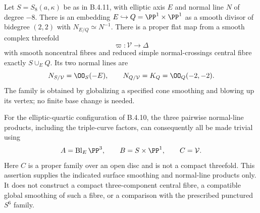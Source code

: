 \begin{proposition}\label{push:src:B.4.12}
Let $S=S_8(a,\kappa)$ be as in B.4.11, with elliptic axis $E$
and normal line $N$ of degree $-8$.
There is an embedding $E\hookrightarrow Q=\PP^1\times\PP^1$
as a smooth divisor of bidegree $(2,2)$ with
$N_{E/Q}\simeq N^{-1}$.
There is a proper flat map from a smooth complex threefold
\[
 \varpi:\mathcal V\longrightarrow\Delta
\]
with smooth noncentral fibres and reduced simple normal-crossings
central fibre exactly $S\cup_E Q$.  Its two normal lines are
\[
 N_{S/\mathcal V}=\OO_S(-E),\qquad
 N_{Q/\mathcal V}=K_Q=\OO_Q(-2,-2).
\]
The family is obtained by globalizing a specified cone smoothing
and blowing up its vertex; no finite base change is needed.

For the elliptic-quartic configuration of B.4.10, the three
pairwise normal-line products, including the triple-curve factors,
can consequently all be made trivial using
\[
 A=\operatorname{Bl}_E\PP^3,\qquad
 B=S\times\PP^1,\qquad C=\mathcal V.
\]
Here $C$ is a proper family over an open disc and is not a compact
threefold.  This assertion supplies the indicated surface smoothing
and normal-line products only.  It does not construct a compact
three-component central fibre, a compatible global smoothing of
such a fibre, or a comparison with the prescribed punctured
$S^6$ family.
\end{proposition}
